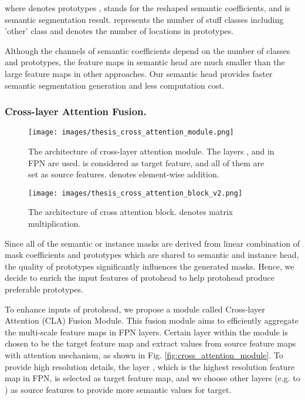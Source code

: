 \documentclass[runningheads]{llncs}
\begin{document}
where  denotes prototypes ,  stands for the reshaped semantic coefficients, and  is semantic segmentation result.  represents the number of stuff classes including 'other' class and  denotes the number of locations in prototypes.

Although the channels of semantic coefficients depend on the number of classes and prototypes, the feature maps in semantic head are much smaller than the large feature maps in other approaches. Our semantic head provides faster semantic segmentation generation and less computation cost.




\subsubsection{Cross-layer Attention Fusion.}
\begin{figure}[!tb]
    \begin{minipage}{.5\textwidth}
    \centering
      \texttt{[image: images/thesis\_cross\_attention\_module.png]}
      \caption{The architecture of cross-layer attention module. The layers ,  and  in FPN are used.  is considered as target feature, and all of them are set as source features.  denotes element-wise addition. }
      \label{fig:cross_attention_module}
      \centering
    \end{minipage}
    \hspace{.05\textwidth}
    \begin{minipage}{.4\textwidth}
    \centering
      \texttt{[image: images/thesis\_cross\_attention\_block\_v2.png]}
      \caption{The architecture of cross attention block.  denotes matrix multiplication. }
      \label{fig:cross_attention_block}
    \centering
    \end{minipage}
\end{figure}
Since all of the semantic or instance masks are derived from linear combination of mask coefficients and prototypes which are shared to semantic and instance head, the quality of prototypes significantly influences the generated masks. Hence, we decide to enrich the input features of protohead to help protohead produce preferable prototypes.

To enhance inputs of protohead, we propose a module called Cross-layer Attention (CLA) Fusion Module. This fusion module aims to efficiently aggregate the multi-scale feature maps in FPN layers. Certain layer within the module is chosen to be the target feature map and extract values from source feature maps with attention mechanism, as shown in Fig. \ref{fig:cross_attention_module}. To provide high resolution details, the layer , which is the highest resolution feature map in FPN, is selected as target feature map, and we choose other layers (e.g.  to ) as source features to provide more semantic values for target. 
\end{document}
